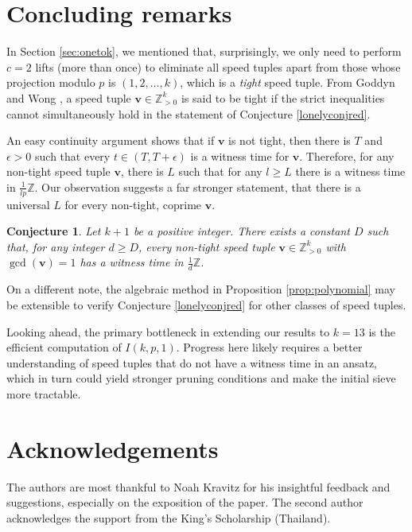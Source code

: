 \documentclass[11pt]{amsart}
\newcommand{\Z}{\mathbb{Z}}
\newcommand{\vbf}{\mathbf{v}}
\newcommand{\onetok}{(1, 2, \dots, k)}
\newtheorem{conjecture}[theorem]{Conjecture}
\theoremstyle{definition}
\theoremstyle{remark}
\begin{document}
\begin{table}[ht]
\vspace{5pt}
\caption{Sets of primes used in the verification of $LRC(k)$ for $k\in\{10,11,12\}$.}
\label{tab:primes}
\end{table}

\section{Concluding remarks}
\label{sec:further}
In Section \ref{sec:onetok}, we mentioned that, 
surprisingly, we only need to perform $c=2$ lifts (more than once) to eliminate all speed tuples apart
from those whose projection modulo $p$ is $\onetok$, which is a \emph{tight} speed tuple.
From Goddyn and Wong \cite{goddyn2006tight}, a speed tuple $\vbf\in\Z_{>0}^k$ is said to be tight if the strict inequalities cannot simultaneously hold in
the statement of Conjecture \ref{lonelyconjred}. 

An easy continuity argument shows that if $\vbf$ is not tight, then there is $T$ and $\epsilon>0$
such that every $t\in(T,T+\epsilon)$ is a witness time for $\vbf$. Therefore, for any non-tight speed tuple $\vbf$, there is $L$ such that for any $l\geq L$ there is a witness time in $\frac{1}{lp}\Z$. Our observation suggests a far stronger statement, that there is a universal $L$ for every non-tight, coprime $\vbf$.

\begin{conjecture}
    Let $k+1$ be a positive integer. There exists a constant $D$ such that, for any integer $d\geq D$, every non-tight speed tuple $\vbf\in\Z_{>0}^k$ with $\gcd(\vbf)=1$ has a witness time in $\frac{1}{d}\Z$.
\end{conjecture}

On a different note, the algebraic method in Proposition \ref{prop:polynomial} may be extensible to verify Conjecture \ref{lonelyconjred} for other classes of speed tuples.

Looking ahead, the primary bottleneck in extending our results to $k = 13$ is the efficient computation of $I(k, p, 1)$. 
Progress here likely requires a better understanding of speed tuples that do not have a witness time in an ansatz, 
which in turn could yield stronger pruning conditions and make the initial sieve more tractable. 

\section*{Acknowledgements}
The authors are most thankful to Noah Kravitz for his insightful feedback and suggestions, 
especially on the exposition of the paper.
The second author acknowledges the support from the King's Scholarship (Thailand).



\end{document}
